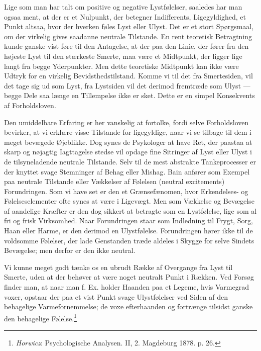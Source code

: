 \documentclass[12pt,a4paper,openany]{book}
\newcommand{\opage}[1]{\marginnote{\footnotesize\textit{[#1]}}}
\begin{document}
Lige som man har talt om positive og negative Lystfølelser, saaledes har
man ogsaa ment, at der er et Nulpunkt, der betegner Indifferents,
Ligegyldighed, et Punkt altsaa, hvor der hverken føles Lyst eller Ulyst.
Det er et stort Spørgsmaal, om der virkelig gives saadanne neutrale
Tilstande. En rent teoretisk Betragtning kunde ganske vist føre til den
Antagelse, at der paa den Linie, der fører fra den højeste Lyst til den
stærkeste Smerte, maa være et Midtpunkt, der ligger lige langt fra begge
Yderpunkter. Men dette teoretiske Midtpunkt kan ikke være Udtryk for en
virkelig Bevidsthedstilstand. Komme vi til det fra Smertesiden, vil det
tage sig ud som Lyst, fra Lystsiden vil det derimod fremtræde som Ulyst
--- begge Dele saa længe en Tillempelse ikke er sket. Dette er en simpel
Konsekvents af Forholdsloven.

Den umiddelbare Erfaring er her vanskelig at fortolke, fordi selve
Forholdsloven bevirker, at vi erklære visse Tilstande for ligegyldige,
naar vi se tilbage til dem i meget bevægede Øjeblikke. Dog synes de
Psykologer at have Ret, der paastaa at skarp og nøjagtig Iagttagelse
stedse vil opdage fine Sitringer af Lyst eller Ulyst i de tilsyneladende
neutrale Tilstande. Selv til de mest abstrakte Tankeprocesser er der
knyttet svage Stemninger af Behag eller Mishag. Bain anfører som Exempel
paa neutrale Tilstande eller Vækkelser af Følelsen (neutral excitements)
Forundringen. Som vi have set er den et Grænsefænomen, hvor Erkendelses-
og Følelseselementer ofte synes at være i Ligevægt. Men som Vækkelse
\opage{340}og Bevægelse af aandelige Kræfter er den dog sikkert at
betragte som en Lystfølelse, lige som al fri og frisk Virksomhed. Naar
Forundringen staar som Indledning til Frygt, Sorg, Haan eller Harme, er
den derimod en Ulystfølelse. Forundringen hører ikke til de voldsomme
Følelser, der lade Genstanden træde aldeles i Skygge for selve Sindets
Bevægelse; men derfor er den ikke neutral.

Vi kunne meget godt tænke os en ubrudt Række af Overgange fra Lyst til
Smerte, uden at der behøver at være noget neutralt Punkt i Rækken. Ved
Forsøg finder man, at naar man f. Ex. holder Haanden paa et Legeme, hvis
Varmegrad voxer, opstaar der paa et vist Punkt svage Ulystfølelser ved
Siden af den behagelige Varmefornemmelse; de voxe efterhaanden og
fortrænge tilsidst ganske den behagelige
Følelse.\footnote[1]{\emph{Horwicz}: Psychologische Analysen. II, 2.
Magdeburg 1878. p. 26.}
\end{document}
